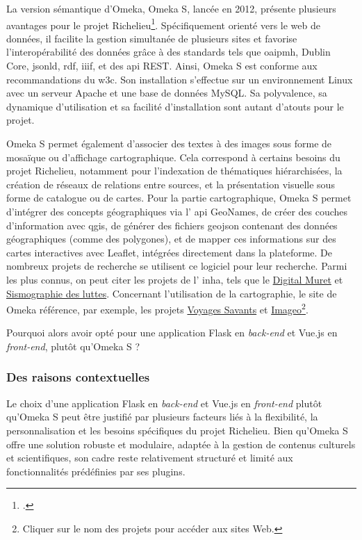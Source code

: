 La version sémantique d’Omeka, Omeka S, lancée en 2012, présente plusieurs avantages pour le projet Richelieu\footcite{bibliotheque2019}. Spécifiquement orienté vers le web de données, il facilite la gestion simultanée de plusieurs sites et favorise l’interopérabilité des données grâce à des standards tels que \acrshort{oaipmh}, Dublin Core, \acrshort{jsonld}, \acrshort{rdf}, \acrshort{iiif}, et des  \acrshort{api} REST. Ainsi, Omeka S est conforme aux recommandations du \acrshort{w3c}. Son installation s’effectue sur un environnement Linux avec un serveur Apache et une base de données MySQL. Sa polyvalence, sa dynamique d’utilisation et sa facilité d’installation sont autant d’atouts pour le projet.

Omeka S permet également d'associer des textes à des images sous forme de mosaïque ou d'affichage cartographique. Cela correspond à certains besoins du projet Richelieu, notamment pour l'indexation de thématiques hiérarchisées, la création de réseaux de relations entre sources, et la présentation visuelle sous forme de catalogue ou de cartes. Pour la partie cartographique, Omeka S permet d'intégrer des concepts géographiques via l' \acrshort{api} GeoNames, de créer des couches d'information avec \acrshort{qgis}, de générer des fichiers \acrshort{geojson} contenant des données géographiques (comme des polygones), et de mapper ces informations sur des cartes interactives avec Leaflet, intégrées directement dans la plateforme. De nombreux projets de recherche se utilisent ce logiciel pour leur recherche. Parmi les plus connus, on peut citer les projets de l' \acrshort{inha}, tels que le \href{https://digitalmuret.inha.fr/s/accueil-muret/page/accueil}{Digital Muret} et \href{https://sismo.inha.fr/s/fr/page/welcome}{Sismographie des luttes}. Concernant l'utilisation de la cartographie, le site de Omeka référence, par exemple, les projets  \href{https://genovefa.bsg.univ-paris3.fr/s/voyages-savants/page/lignes-d-horizon}{Voyages Savants} et \href{https://imageo.univ-lorraine.fr/s/imageo/page/carte}{Imageo}\footnote{Cliquer sur le nom des projets pour accéder aux sites Web.}.  

Pourquoi alors avoir opté pour une application Flask en \textit{back-end} et Vue.js en \textit{front-end}, plutôt qu'Omeka S ?

\subsubsection{Des raisons contextuelles}

Le choix d'une application Flask en \textit{back-end} et Vue.js en \textit{front-end} plutôt qu'Omeka S peut être justifié par plusieurs facteurs liés à la flexibilité, la personnalisation et les besoins spécifiques du projet Richelieu. Bien qu'Omeka S offre une solution robuste et modulaire, adaptée à la gestion de contenus culturels et scientifiques, son cadre reste relativement structuré et limité aux fonctionnalités prédéfinies par ses plugins.

